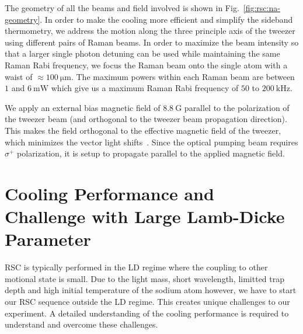 The geometry of all the beams and field involved is shown in Fig.~\ref{fig:rsc:na-geometry}.
In order to make the cooling more efficient and simplify the sideband thermometry,
we address the motion along the three principle axis of the tweezer using different pairs
of Raman beams.
In order to maximize the beam intensity so that a larger single photon detuning can be used
while maintaining the same Raman Rabi frequency,
we focus the Raman beam onto the single atom with a waist of $\approx100~\mathrm{\mu m}$.
The maximum powers within each Raman beam are between $1$ and $6~\mathrm{mW}$
which give us a maximum Raman Rabi frequency of $50$ to $200~\mathrm{kHz}$.

We apply an external bias magnetic field of $8.8~\mathrm{G}$ parallel to the polarization
of the tweezer beam (and orthogonal to the tweezer beam propagation direction).
This makes the field orthogonal to the effective magnetic field of the tweezer,
which minimizes the vector light shifts~\cite{kaufman_cooling_2012,thompson_coherence_2013}.
Since the optical pumping beam requires $\sigma^+$ polarization,
it is setup to propagate parallel to the applied magnetic field.

\section{Cooling Performance and Challenge with Large Lamb-Dicke Parameter}
\label{ch:rsc:challenges}

RSC is typically performed in the LD regime where the coupling
to other motional state is small.
Due to the light mass, short wavelength, limitted trap depth and high initial temperature
of the sodium atom however, we have to start our RSC sequence outside the LD regime.
This creates unique challenges to our experiment.
A detailed understanding of the cooling performance is required to understand
and overcome these challenges.

